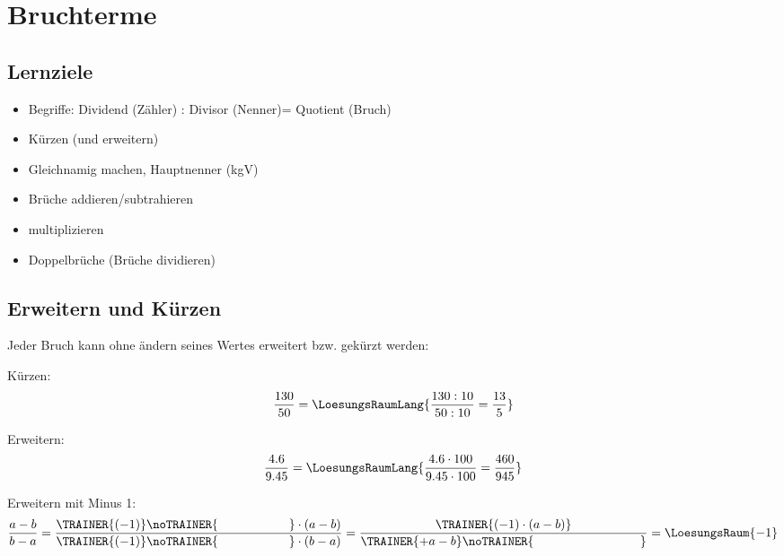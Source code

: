 \newpage
\section{Bruchterme}

\subsection*{Lernziele}

\begin{itemize}
	\item Begriffe: Dividend (Zähler) : Divisor
	(Nenner)= Quotient (Bruch)
  \item Kürzen (und erweitern)
	\item Gleichnamig machen, Hauptnenner (kgV)
	\item Brüche addieren/subtrahieren
  \item multiplizieren
	\item Doppelbrüche (Brüche dividieren) 
\end{itemize}


\newpage

\subsection{Erweitern und Kürzen}

Jeder Bruch kann ohne ändern seines Wertes erweitert bzw. gekürzt
werden:

Kürzen:
$$\frac{130}{50} = \LoesungsRaumLang{\frac{130 : 10}{50:10} =\frac{13}{5}}$$

Erweitern:
$$\frac{4.6}{9.45} = \LoesungsRaumLang{\frac{4.6 \cdot{}100}{9.45\cdot{}100} =
\frac{460}{945}}$$

Erweitern mit Minus 1:
$$\frac{a-b}{b-a} = \frac{\TRAINER{(-1)}\noTRAINER{\hspace{20mm}}\cdot(a-b)}{\TRAINER{(-1)}\noTRAINER{\hspace{20mm}}\cdot(b-a)}
= \frac{\TRAINER{(-1)\cdot(a-b)}}{\TRAINER{+a-b}\noTRAINER{\hspace{30mm}}} = \LoesungsRaum{-1}$$

